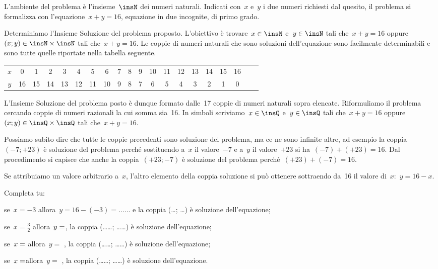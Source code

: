 \begin{soluzione}
L'ambiente del problema è l'insieme~$\insN$ dei numeri naturali. Indicati 
con~$x$ e~$y$ i due numeri
richiesti dal quesito, il problema si formalizza con l'equazione~$x+y=16$, 
equazione in due incognite, di
primo grado.

Determiniamo l'Insieme Soluzione del problema proposto.
L'obiettivo è trovare~$x\in\insN$ e~$y\in\insN$ tali che~$x+y=16$ 
oppure~$(x;y)\in\insN\times\insN$ tali che~$x+y=16$.
Le coppie di numeri naturali che sono soluzioni
dell'equazione sono facilmente determinabili e sono
tutte quelle riportate nella tabella seguente.

\begin{tabular}{cccccccccccccccccccc}
\toprule
$x$ & 0 & 1 & 2 & 3 & 4 & 5 & 6 & 7 & 8 & 9 & 10 & 11 & 12 & 13 & 14 & 15 & 16\\
$y$ & 16 & 15 & 14 & 13 & 12 & 11 & 10 & 9 & 8 & 7 & 6 & 5 & 4 & 3 & 2 & 1 & 0\\
\bottomrule
\end{tabular}

L'Insieme Soluzione del problema posto è dunque
formato dalle~17 coppie di numeri naturali sopra elencate.
Riformuliamo il problema cercando coppie di numeri razionali la cui
somma sia~16.
In simboli scriviamo~$x\in\insQ$ e~$y\in\insQ$ tali che~$x+y=16$ 
oppure~$(x;y)\in\insQ\times\insQ$ tali che~$x+y=16$.

Possiamo subito dire che tutte le coppie precedenti sono soluzione del
problema, ma ce ne sono infinite altre, ad esempio la coppia~$(-7;+23)$ è 
soluzione del problema perché sostituendo a~$x$ il
valore~$-7$ e a~$y$ il valore~$+23$ si ha~$(-7)+(+23)=16$.
Dal procedimento si capisce che anche la coppia~$(+23;-7)$ è
soluzione del problema perché~$(+23)+(-7)=16$.

Se attribuiamo un valore arbitrario a~$x$, l'altro
elemento della coppia soluzione si può ottenere sottraendo da~16 il
valore di~$x$:~$y=16-x$.

Completa tu:

\begin{itemize*}
\item se~$x=-3$ allora~$y=16-(-3)=\ldots\ldots$ e la coppia (\ldots; \ldots) è 
soluzione dell'equazione;
\item se~$x=\frac{3}{2}$ allora~$y =\dotfill$, la coppia (\ldots\ldots; 
\ldots\ldots) è soluzione dell'equazione;
\item se~$x =\dotfill$ allora~$y=$ \dotfill, la coppia (\ldots\ldots; 
\ldots\ldots) è soluzione dell'equazione;
\item se~$x=\dotfill$allora~$y =$ \dotfill, la coppia (\ldots\ldots; 
\ldots\ldots) è soluzione dell'equazione.
\end{itemize*}


\end{soluzione}

